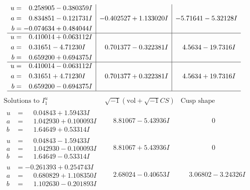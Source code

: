 \documentclass[1p]{elsarticle_modified}
\theoremstyle{definition}
\newcommand{\I}{\sqrt{-1}}
\begin{document}
$$\begin{array}{c|c|c}
\begin{aligned}
u &= \phantom{-}0.258905 - 0.380359 I \\
a &= \phantom{-}0.834851 - 0.121731 I \\
b &= -0.074634 + 0.484044 I\end{aligned}
 & -0.402527 + 1.133020 I & -5.71641 - 5.32128 I \\ \hline\begin{aligned}
u &= \phantom{-}0.410014 + 0.063112 I \\
a &= \phantom{-}0.31651 - 4.71230 I \\
b &= \phantom{-}0.659200 + 0.694375 I\end{aligned}
 & \phantom{-}0.701377 - 0.322381 I & \phantom{-}4.5634 - 19.7316 I \\ \hline\begin{aligned}
u &= \phantom{-}0.410014 - 0.063112 I \\
a &= \phantom{-}0.31651 + 4.71230 I \\
b &= \phantom{-}0.659200 - 0.694375 I\end{aligned}
 & \phantom{-}0.701377 + 0.322381 I & \phantom{-}4.5634 + 19.7316 I\\
 \hline 
 \end{array}$$\newpage$$\begin{array}{c|c|c}  
\text{Solutions to }I^u_{1}& \I (\text{vol} + \sqrt{-1}CS) & \text{Cusp shape}\\
 \hline 
\begin{aligned}
u &= \phantom{-}0.04843 + 1.59433 I \\
a &= \phantom{-}1.042930 + 0.100093 I \\
b &= \phantom{-}1.64649 + 0.53314 I\end{aligned}
 & \phantom{-}8.81067 - 5.43936 I & \phantom{-0.000000 } 0 \\ \hline\begin{aligned}
u &= \phantom{-}0.04843 - 1.59433 I \\
a &= \phantom{-}1.042930 - 0.100093 I \\
b &= \phantom{-}1.64649 - 0.53314 I\end{aligned}
 & \phantom{-}8.81067 + 5.43936 I & \phantom{-0.000000 } 0 \\ \hline\begin{aligned}
u &= -0.261393 + 0.254743 I \\
a &= \phantom{-}0.680829 + 1.108350 I \\
b &= \phantom{-}1.102630 - 0.201893 I\end{aligned}
 & \phantom{-}2.68024 - 0.40653 I & \phantom{-}3.06802 - 3.24326 I \\ \hline\begin{aligned}

\end{aligned}
\end{array}$$
\end{document}
